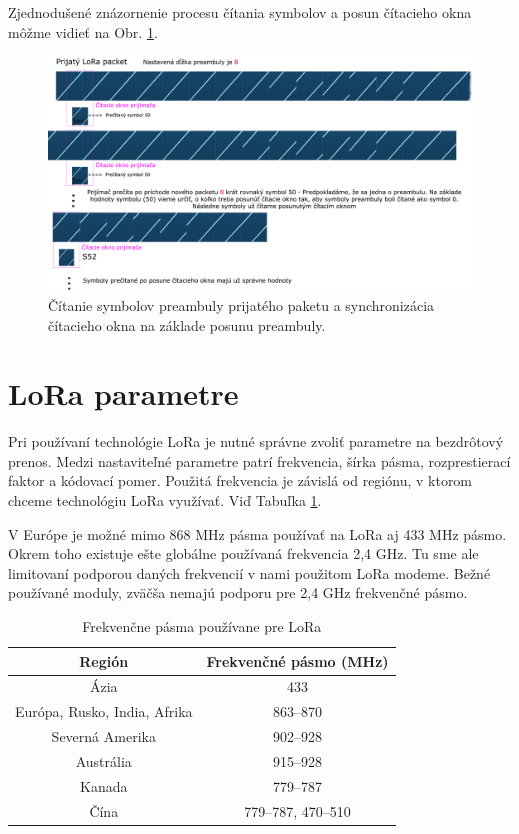 \documentclass[slovak,master]{diploma}
\begin{document}
Zjednodušené znázornenie procesu čítania symbolov a posun čítacieho okna môžme vidieť na Obr. \ref{fig:loraPreamble1}.

\begin{figure}[h!]
	\centering
	\includegraphics[width=1\textwidth]{Figures/preambulaSmall.png}
	\caption[Čítanie symbolov preambuly]{Čítanie symbolov preambuly prijatého paketu a synchronizácia čítacieho okna na základe posunu preambuly.}
	\label{fig:loraPreamble1}
\end{figure}

\newpage
\section{LoRa parametre}
Pri používaní technológie LoRa je nutné správne zvoliť parametre na bezdrôtový prenos. Medzi nastaviteľné parametre patrí frekvencia, šírka pásma, rozprestierací faktor a kódovací pomer.
Použitá frekvencia je závislá od regiónu, v ktorom chceme technológiu LoRa využívať. Viď Tabuľka \ref{tab:ismBands}. 

V Európe je možné mimo 868 MHz pásma používať na LoRa aj 433 MHz pásmo. Okrem toho existuje ešte globálne používaná frekvencia 2,4 GHz. Tu sme ale limitovaní 
podporou daných frekvencií v nami použitom LoRa modeme. Bežné používané moduly, zväčša nemajú podporu pre 2,4 GHz frekvenčné pásmo.

\begin{table}[h!]
	\centering
  \small
  \setlength\tabcolsep{6pt}
	\caption[Frekvenčne pásma používane pre LoRa]{Frekvenčne pásma používane pre LoRa}
  \begin{tabular}{c|c}
    \toprule
    Región & Frekvenčné pásmo (MHz)\\
    \midrule
    Ázia & 433 \\
    Európa, Rusko, India, Afrika & 863--870 \\
    Severná Amerika & 902--928 \\
    Austrália & 915--928 \\
    Kanada & 779--787 \\
    Čína & 779--787, 470--510 \\
    \midrule
  \end{tabular}
  \label{tab:ismBands}
\end{table}
\newpage
\end{document}
